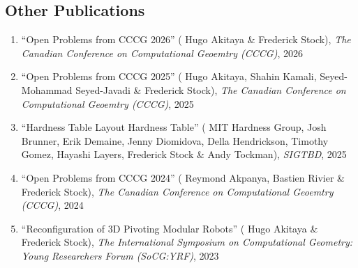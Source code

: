 \documentclass[letterpaper,11pt]{article}
\makeatletter
\newcommand{\resumeSubHeadingListStart}{\begin{itemize}[leftmargin=*]}
\newcommand{\resumeSubHeadingListEnd}{\end{itemize}}
\newcommand{\publication}[6]{
  \item ``#1'' %
   (\ignorespaces#2), %
     \emph{#3}, %
      #4%


}
\newcommand{\pdficon}{\faFilePdf}
\newcommand{\doilabel}{\texttt{DOI}}
\makeatother
\begin{document}
    \subsection*{Other Publications}%
  
    \begin{enumerate}
    \setcounter{enumi}{\value{pubnum}}
      
        \publication
          {Open Problems from CCCG 2026}
          {
 Hugo Akitaya \& Frederick Stock}
          {The Canadian Conference on Computational Geoemtry (CCCG)}
          {2026}
          {%
\href{fred-stock.github.io/docstore/}{\pdficon}%
%
%
          }
          {1}
 \vspace{-.5em}  
      
        \publication
          {Open Problems from CCCG 2025}
          {
 Hugo Akitaya, Shahin Kamali, Seyed-Mohammad Seyed-Javadi \& Frederick Stock}
          {The Canadian Conference on Computational Geoemtry (CCCG)}
          {2025}
          {%
\href{fred-stock.github.io/docstore/}{\pdficon}%
%
%
          }
          {2}
 \vspace{-.5em}  
      
        \publication
          {Hardness Table Layout Hardness Table}
          {
 MIT Hardness Group, Josh Brunner, Erik Demaine, Jenny Diomidova, Della Hendrickson, Timothy Gomez, Hayashi Layers, Frederick Stock \& Andy Tockman}
          {SIGTBD}
          {2025}
          {%
\href{fred-stock.github.io/docstore/hardness-table-layout-SIGTBD.pdf}{\pdficon}%
%
%
          }
          {3}
 \vspace{-.5em}  
      
        \publication
          {Open Problems from CCCG 2024}
          {
 Reymond Akpanya, Bastien Rivier \& Frederick Stock}
          {The Canadian Conference on Computational Geoemtry (CCCG)}
          {2024}
          {%
\href{fred-stock.github.io/docstore/CCCG_Open_Problems-2024.pdf}{\pdficon}%
%
%
          }
          {4}
 \vspace{-.5em}  
      
        \publication
          {Reconfiguration of 3D Pivoting Modular Robots}
          {
 Hugo Akitaya \& Frederick Stock}
          {The International Symposium on Computational Geometry: Young Researchers Forum (SoCG:YRF)}
          {2023}
          {%
\href{fred-stock.github.io/docstore/Reconfiguration-3D-Pivoting-MR-SOCGYRF.pdf}{\pdficon}%
%
\quad\href{https://doi.org/10.48550/arXiv.2304.09990}{\doilabel}%
          }
          {5}
 
    \setcounter{pubnum}{\value{enumi}}
    \end{enumerate}
\end{document}
